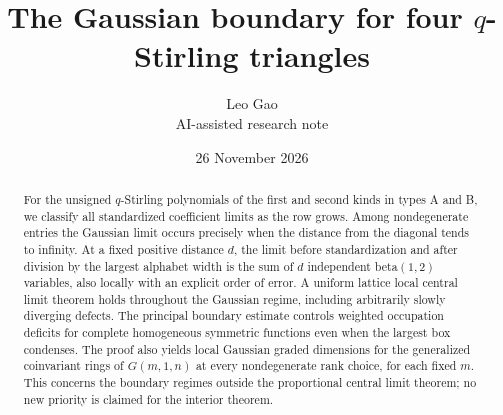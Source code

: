 \documentclass[11pt]{article}
\title{The Gaussian boundary for four $q$-Stirling triangles}
\author{Leo Gao\\\small AI-assisted research note}
\date{26 November 2026}
\begin{document}
\maketitle
\begin{abstract}For the unsigned $q$-Stirling polynomials of the first and second kinds in types A and B, we classify all standardized coefficient limits as the row grows. Among nondegenerate entries the Gaussian limit occurs precisely when the distance from the diagonal tends to infinity. At a fixed positive distance $d$, the limit before standardization and after division by the largest alphabet width is the sum of $d$ independent beta$(1,2)$ variables, also locally with an explicit order of error. A uniform lattice local central limit theorem holds throughout the Gaussian regime, including arbitrarily slowly diverging defects. The principal boundary estimate controls weighted occupation deficits for complete homogeneous symmetric functions even when the largest box condenses. The proof also yields local Gaussian graded dimensions for the generalized coinvariant rings of $G(m,1,n)$ at every nondegenerate rank choice, for each fixed $m$. This concerns the boundary regimes outside the proportional central limit theorem; no new priority is claimed for the interior theorem.\end{abstract}
\end{document}
